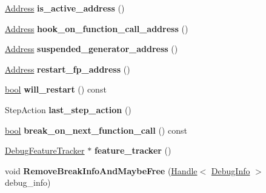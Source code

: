 \begin{DoxyCompactItemize}
\mbox{\hyperlink{classuintptr__t}{Address}} {\bfseries is\+\_\+active\+\_\+address} ()
\item 
\mbox{\label{classv8_1_1internal_1_1Debug_a25ef04805028d9eeef793ff917caf193}} 
\mbox{\hyperlink{classuintptr__t}{Address}} {\bfseries hook\+\_\+on\+\_\+function\+\_\+call\+\_\+address} ()
\item 
\mbox{\label{classv8_1_1internal_1_1Debug_ae88f2057e100918fedd05a41c2918ae6}} 
\mbox{\hyperlink{classuintptr__t}{Address}} {\bfseries suspended\+\_\+generator\+\_\+address} ()
\item 
\mbox{\label{classv8_1_1internal_1_1Debug_a23cc8673351cbb058c4d2d9ed8d724ab}} 
\mbox{\hyperlink{classuintptr__t}{Address}} {\bfseries restart\+\_\+fp\+\_\+address} ()
\item 
\mbox{\label{classv8_1_1internal_1_1Debug_a0d96008b71b6188d57295de3bd29bd01}} 
\mbox{\hyperlink{classbool}{bool}} {\bfseries will\+\_\+restart} () const
\item 
\mbox{\label{classv8_1_1internal_1_1Debug_a93af8c4938d17fb18a004e60f805c1cc}} 
Step\+Action {\bfseries last\+\_\+step\+\_\+action} ()
\item 
\mbox{\label{classv8_1_1internal_1_1Debug_a5892ec0fd915dd7ab4a04276282def19}} 
\mbox{\hyperlink{classbool}{bool}} {\bfseries break\+\_\+on\+\_\+next\+\_\+function\+\_\+call} () const
\item 
\mbox{\label{classv8_1_1internal_1_1Debug_aa40b5c572829bff579e3ca8e14e6d056}} 
\mbox{\hyperlink{classv8_1_1internal_1_1DebugFeatureTracker}{Debug\+Feature\+Tracker}} $\ast$ {\bfseries feature\+\_\+tracker} ()
\item 
\mbox{\label{classv8_1_1internal_1_1Debug_a7067a94c29ee6f311b4532504716962d}} 
void {\bfseries Remove\+Break\+Info\+And\+Maybe\+Free} (\mbox{\hyperlink{classv8_1_1internal_1_1Handle}{Handle}}$<$ \mbox{\hyperlink{classv8_1_1internal_1_1DebugInfo}{Debug\+Info}} $>$ debug\+\_\+info)
\end{DoxyCompactItemize}
